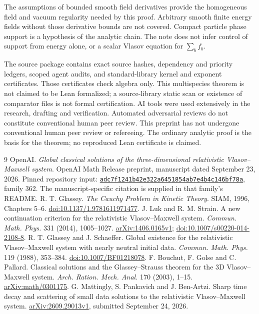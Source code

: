 \documentclass[11pt]{article}
\theoremstyle{remark}\newtheorem{remark}[theorem]{Remark}
\numberwithin{equation}{section}
\begin{document}
The assumptions of bounded smooth field derivatives provide the homogeneous
field and vacuum regularity needed by this proof. Arbitrary smooth finite
energy fields without those derivative bounds are not covered. Compact
particle phase support is a hypothesis of the analytic chain. The note
does not infer control of support from energy alone, or a scalar Vlasov
equation for $\sum_b f_b$.

The source package contains exact source hashes, dependency and priority
ledgers, scoped agent audits, and standard-library kernel and exponent
certificates. Those certificates check algebra only. This multispecies
theorem is not claimed to be Lean formalized; a source-library static scan
or existence of comparator files is not formal certification.
AI tools were used extensively in the research, drafting and verification.
Automated adversarial reviews do not constitute conventional human peer
review. This preprint has not undergone conventional human peer review or
refereeing. The ordinary analytic proof is the basis for the theorem; no
reproduced Lean certificate is claimed.

\begin{thebibliography}{9}
 OpenAI.
\emph{Global classical solutions of the three-dimensional relativistic
Vlasov--Maxwell system}. OpenAI Math Release preprint, manuscript dated
September 23, 2026. Pinned repository input:
\href{https://github.com/openai/math/tree/adc7f1241b42e322a6451854ab7e4b4c146bf78a}{\texttt{adc7f1241b42e322a6451854ab7e4b4c146bf78a}}, family 362.
The manuscript-specific citation is supplied in that family's README.
 R. T. Glassey. \emph{The Cauchy Problem in Kinetic Theory}.
SIAM, 1996, Chapters 5--6. \href{https://doi.org/10.1137/1.9781611971477}{doi:10.1137/1.9781611971477}.
 J. Luk and R. M. Strain.
A new continuation criterion for the relativistic Vlasov--Maxwell system.
\emph{Commun. Math. Phys.} 331 (2014), 1005--1027.
\href{https://arxiv.org/abs/1406.0165v1}{arXiv:1406.0165v1};
\href{https://doi.org/10.1007/s00220-014-2108-8}{doi:10.1007/s00220-014-2108-8}.
 R. T. Glassey and J. Schaeffer.
Global existence for the relativistic Vlasov--Maxwell system with nearly
neutral initial data. \emph{Commun. Math. Phys.} 119 (1988), 353--384.
\href{https://doi.org/10.1007/BF01218078}{doi:10.1007/BF01218078}.
 F. Bouchut, F. Golse and C. Pallard.
Classical solutions and the Glassey--Strauss theorem for the 3D
Vlasov--Maxwell system. \emph{Arch. Ration. Mech. Anal.} 170 (2003), 1--15.
\href{https://arxiv.org/abs/math/0301175}{arXiv:math/0301175}.
 G. Mattingly, S. Pankavich and J. Ben-Artzi.
Sharp time decay and scattering of small data solutions to the relativistic
Vlasov--Maxwell system. \href{https://arxiv.org/abs/2609.29013v1}{arXiv:2609.29013v1},
submitted September 24, 2026.
\end{thebibliography}
\end{document}
